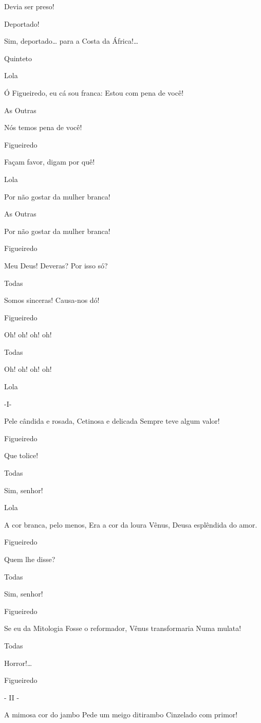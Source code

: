  Devia ser preso!

 Deportado!

 Sim, deportado\ldots{} para a Costa da África!\ldots{}

 Quinteto

 Lola

 Ó Figueiredo, eu cá sou franca:
 Estou com pena de você!

 As Outras

 Nós temos pena de você!

 Figueiredo

 Façam favor, digam por quê!

 Lola

 Por não gostar da mulher branca!

 As Outras

 Por não gostar da mulher branca!

 Figueiredo

 Meu Deus! Deveras? 
 Por isso só?

 Todas

 Somos sinceras!
 Causa-nos dó!

 Figueiredo

 Oh! oh! oh! oh!

 Todas

 Oh! oh! oh! oh!

 Lola

 -I-

 Pele cândida e rosada, 
 Cetinosa e delicada 
 Sempre teve algum valor!

 Figueiredo

 Que tolice!

 Todas

 Sim, senhor!

 Lola

 A cor branca, pelo menos, 
 Era a cor da loura Vênus, 
 Deusa esplêndida do amor.

 Figueiredo

 Quem lhe disse?

 Todas

 Sim, senhor!

 Figueiredo

 Se eu da Mitologia 
 Fosse o reformador, 
 Vênus transformaria 
 Numa mulata!

 Todas

 Horror!\ldots{}

 Figueiredo

 - II -

 A mimosa cor do jambo 
 Pede um meigo ditirambo 
 Cinzelado com primor!

